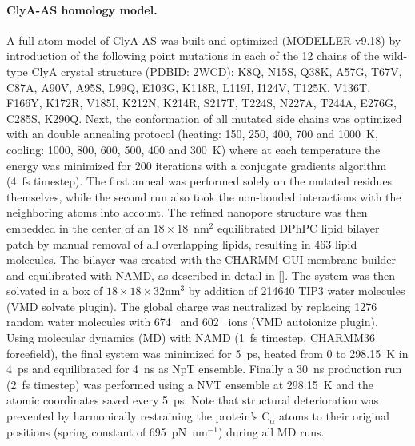 \documentclass[journal=ancac3,manuscript=article,etalmode=truncate,maxauthors=0,layout=twocolumn]{achemso}
\begin{document}
\paragraph{ClyA-AS homology model.} A full atom model of ClyA-AS\cite{Soskine-2013} was built and optimized
(MODELLER v9.18\cite{Sali-1993}) by introduction of the following point mutations in each of the 12 chains of
the wild-type ClyA crystal structure (PDBID: 2WCD\cite{Mueller-2009}): K8Q, N15S, Q38K, A57G, T67V, C87A,
A90V, A95S, L99Q, E103G, K118R, L119I, I124V, T125K, V136T, F166Y, K172R, V185I, K212N, K214R, S217T, T224S,
N227A, T244A, E276G, C285S, K290Q. Next, the conformation of all mutated side chains was optimized with an
double annealing protocol (heating: 150, 250, 400, 700 and 1000~K, cooling: 1000, 800, 600, 500, 400 and
300~K) where at each temperature the energy was minimized for 200 iterations with a conjugate gradients
algorithm (4~fs timestep).\cite{Shanno-1980} The first anneal was performed solely on the mutated residues
themselves, while the second run also took the non-bonded interactions with the neighboring atoms into
account. The refined nanopore structure was then embedded in the center of an $18\times18$~nm$^2$ equilibrated
DPhPC lipid bilayer patch by manual removal of all overlapping lipids, resulting in 463 lipid molecules. The
bilayer was created with the CHARMM-GUI\cite{Jo-2008} membrane builder\cite{Lee-2016} and equilibrated with
NAMD\cite{Phillips-2005}, as described in detail in []. The system was then solvated in a box
of $18\times18\times32\text{nm}^3$ by addition of 214640 TIP3 water molecules (VMD solvate plugin). The global
charge was neutralized by replacing 1276 random water molecules with 674 \Na\ and 602 \Cl\ ions (VMD
autoionize plugin).\cite{Humphrey-1996} Using molecular dynamics (MD) with NAMD (1~fs timestep, CHARMM36
forcefield\cite{Best-2012}), the final system was minimized for 5~ps, heated from 0 to 298.15~K in 4~ps and
equilibrated for 4~ns as NpT ensemble.\cite{Aksimentiev-2005} Finally a 30~ns production run (2~fs timestep)
was performed using a NVT ensemble at 298.15~K and the atomic coordinates saved every 5~ps. Note that
structural deterioration was prevented by harmonically restraining the protein's C$_\alpha$ atoms to their
original positions (spring constant of 695~pN~nm$^{-1}$) during all MD runs.\cite{Bhattacharya-2011}
\end{document}
